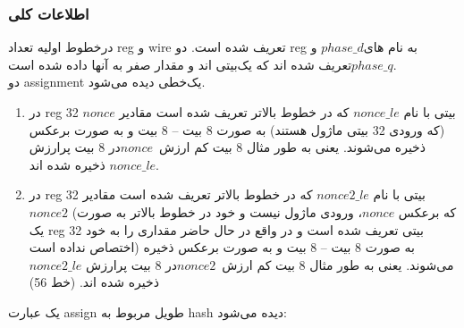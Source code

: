 \subsubsection{اطلاعات کلی}
درخطوط اولیه تعداد reg و wire تعریف شده است.
دو reg به نام های$ phase\_d$ و $phase\_q $تعریف شده اند که یک‌بیتی اند و مقدار صفر به آنها داده شده است.\\
دو assignment یک‌خطی دیده می‌شود.

\begin{enumerate}
	\item در reg 32 بیتی با نام $nonce\_le$ که در خطوط بالاتر تعریف شده است مقادیر $nonce$ (که ورودی 32 بیتی ماژول هستند) به صورت 8 بیت – 8 بیت و به صورت برعکس ذخیره می‌شوند. یعنی به طور مثال 8 بیت کم ارزش\  $nonce$در 8 بیت پرارزش $nonce\_le$ ذخیره شده اند.
	      
	\item در reg 32 بیتی با نام $nonce2\_le$ که در خطوط بالاتر تعریف شده است مقادیر $nonce2$ (که برعکس $nonce$، ورودی ماژول نیست و خود در خطوط بالاتر به صورت یک reg 32 بیتی تعریف شده است و در واقع در حال حاضر مقداری را به خود اختصاص نداده است) به صورت 8 بیت – 8 بیت و به صورت برعکس ذخیره می‌شوند. یعنی به طور مثال 8 بیت کم ارزش\  $nonce2$در 8 بیت پرارزش  $nonce2\_le$ ذخیره شده اند. (خط 56)
\end{enumerate}

یک عبارت assign طویل مربوط به hash دیده می‌شود:

